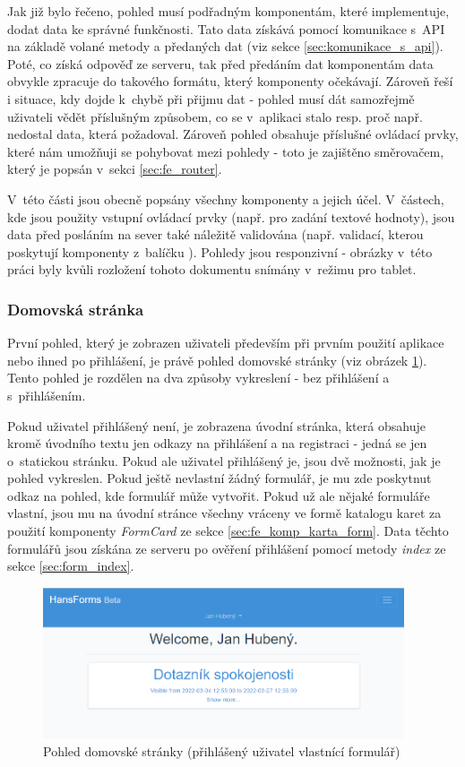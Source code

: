 	Jak již bylo řečeno, pohled musí podřadným komponentám, které implementuje, dodat data ke správné funkčnosti. Tato data získává pomocí komunikace s~API na základě volané metody a předaných dat (viz sekce \ref{sec:komunikace_s_api}). Poté, co získá odpověď ze serveru, tak před předáním dat komponentám data obvykle zpracuje do takového formátu, který komponenty očekávají. Zároveň řeší i situace, kdy dojde k~chybě při přijmu dat - pohled musí dát samozřejmě uživateli vědět příslušným způsobem, co se v~aplikaci stalo resp. proč např. nedostal data, která požadoval. Zároveň pohled obsahuje příslušné ovládací prvky, které nám umožňuji se pohybovat mezi pohledy - toto je zajištěno směrovačem, který je popsán v~sekci \ref{sec:fe_router}.
	
	V~této části jsou obecně popsány všechny komponenty a jejich účel. V~částech, kde jsou použity vstupní ovládací prvky (např. pro zadání textové hodnoty), jsou data před posláním na sever také náležitě validována (např. validací, kterou poskytují komponenty z~balíčku ). Pohledy jsou responzivní - obrázky v~této práci byly kvůli rozložení tohoto dokumentu snímány v~režimu pro tablet. 
		
		\subsubsection{Domovská stránka} %
		První pohled, který je zobrazen uživateli především při prvním použití aplikace nebo ihned po přihlášení, je právě pohled domovské stránky (viz obrázek \ref{fig:pohled_home}). Tento pohled je rozdělen na dva způsoby vykreslení - bez přihlášení a s~přihlášením.
		
		Pokud uživatel přihlášený není, je zobrazena úvodní stránka, která obsahuje kromě úvodního textu jen odkazy na přihlášení a na registraci - jedná se jen o~statickou stránku. Pokud ale uživatel přihlášený je, jsou dvě možnosti, jak je pohled vykreslen. Pokud ještě nevlastní žádný formulář, je mu zde poskytnut odkaz na pohled, kde formulář může vytvořit. Pokud už ale nějaké formuláře vlastní, jsou mu na úvodní stránce všechny vráceny ve formě katalogu karet za použití komponenty \textit{FormCard} ze sekce \ref{sec:fe_komp_karta_form}. Data těchto formulářů jsou získána ze serveru po ověření přihlášení pomocí metody \textit{index} ze sekce \ref{sec:form_index}.
		
		\begin{figure}[h]
			\centering
			\includegraphics[width=0.95\textwidth]{img/pohledy/home.png}
			\caption{Pohled domovské stránky (přihlášený uživatel vlastnící formulář)}
			\label{fig:pohled_home}
		\end{figure}
	

